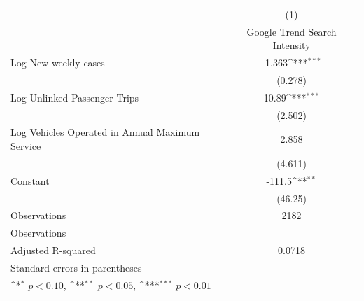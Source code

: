 {
\def\sym#1{\ifmmode^{#1}\else\(^{#1}\)\fi}
\begin{tabular}{l*{1}{c}}
\toprule
                    &\multicolumn{1}{c}{(1)}\\
                    &\multicolumn{1}{c}{Google Trend Search Intensity}\\
\midrule
Log New weekly cases&      -1.363\sym{***}\\
                    &     (0.278)         \\
\addlinespace
Log Unlinked Passenger Trips&       10.89\sym{***}\\
                    &     (2.502)         \\
\addlinespace
Log Vehicles Operated in Annual Maximum Service&       2.858         \\
                    &     (4.611)         \\
\addlinespace
Constant            &      -111.5\sym{**} \\
                    &     (46.25)         \\
\midrule
Observations        &        2182         \\
Observations        &                     \\
Adjusted R-squared  &      0.0718         \\
\bottomrule
\multicolumn{2}{l}{\footnotesize Standard errors in parentheses}\\
\multicolumn{2}{l}{\footnotesize \sym{*} \(p<0.10\), \sym{**} \(p<0.05\), \sym{***} \(p<0.01\)}\\
\end{tabular}
}
